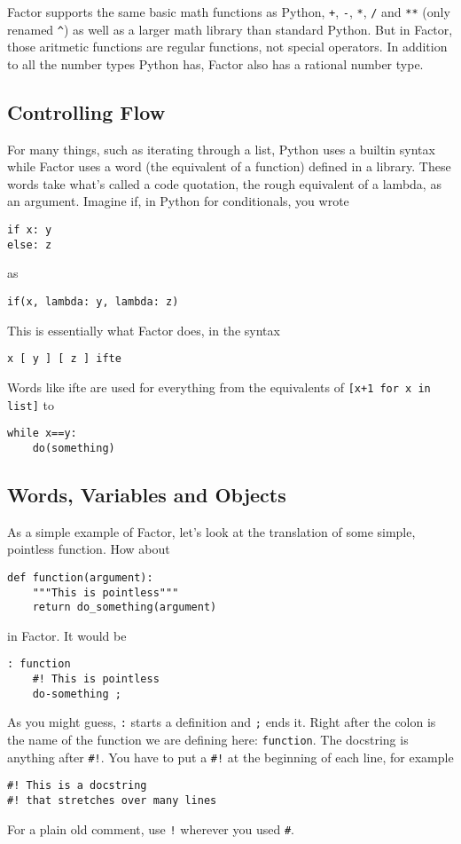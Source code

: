 \documentclass{article}
\begin{document}
Factor supports the same basic math functions as Python, \texttt{+}, \texttt{-}, \texttt{*}, \texttt{/} and \texttt{**} (only renamed \texttt{\^{}}) as well as a larger math library than standard Python. But in Factor, those aritmetic functions are regular functions, not special operators. In addition to all the number types Python has, Factor also has a rational number type.

\subsection{Controlling Flow}

For many things, such as iterating through a list, Python uses a builtin syntax while Factor uses a word (the equivalent of a function) defined in a library. These words take what's called a code quotation, the rough equivalent of a lambda, as an argument. Imagine if, in Python for conditionals, you wrote
\begin{verbatim}
if x: y
else: z
\end{verbatim}
as
\begin{verbatim}
if(x, lambda: y, lambda: z)
\end{verbatim}
This is essentially what Factor does, in the syntax
\begin{verbatim}
x [ y ] [ z ] ifte
\end{verbatim}
Words like ifte are used for everything from the equivalents of \verb|[x+1 for x in list]| to
\begin{verbatim}
while x==y:
    do(something)
\end{verbatim}

\subsection{Words, Variables and Objects}

As a simple example of Factor, let's look at the translation of some simple, pointless function. How about
\begin{verbatim}
def function(argument):
    """This is pointless"""
    return do_something(argument)
\end{verbatim}
in Factor. It would be
\begin{verbatim}
: function
    #! This is pointless
    do-something ;
\end{verbatim}
As you might guess, \texttt{:} starts a definition and \texttt{;} ends it. Right after the colon is the name of the function we are defining here: \texttt{function}. The docstring is anything after \verb|#!|. You have to put a \verb|#!| at the beginning of each line, for example
\begin{verbatim}
#! This is a docstring
#! that stretches over many lines
\end{verbatim}
For a plain old comment, use \texttt{!} wherever you used \verb|#|.
\end{document}
